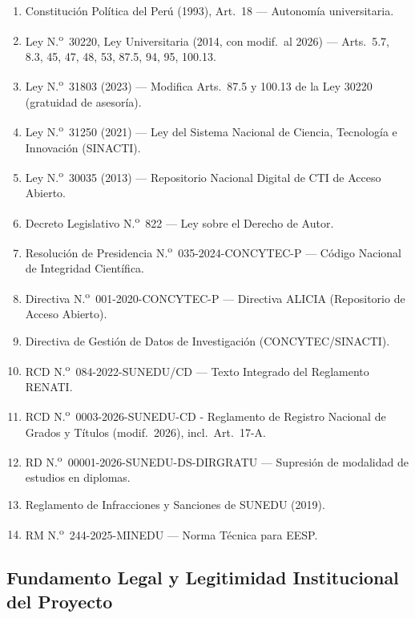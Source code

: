 \vspace{10pt}
\begingroup
\normalsize
\begin{enumerate}[leftmargin=*, nosep, label={\arabic*.}]
  \item Constitución Política del Perú (1993), Art.~18 --- Autonomía universitaria.
  \item Ley N.\textsuperscript{o}~30220, Ley Universitaria (2014, con modif.\ al 2026) --- Arts.~5.7, 8.3, 45, 47, 48, 53, 87.5, 94, 95, 100.13.
  \item Ley N.\textsuperscript{o}~31803 (2023) --- Modifica Arts.~87.5 y 100.13 de la Ley 30220 (gratuidad de asesoría).
  \item Ley N.\textsuperscript{o}~31250 (2021) --- Ley del Sistema Nacional de Ciencia, Tecnología e Innovación (SINACTI).
  \item Ley N.\textsuperscript{o}~30035 (2013) --- Repositorio Nacional Digital de CTI de Acceso Abierto.
  \item Decreto Legislativo N.\textsuperscript{o}~822 --- Ley sobre el Derecho de Autor.
  \item Resolución de Presidencia N.\textsuperscript{o}~035-2024-CONCYTEC-P --- Código Nacional de Integridad Científica.
  \item Directiva N.\textsuperscript{o}~001-2020-CONCYTEC-P --- Directiva ALICIA (Repositorio de Acceso Abierto).
  \item Directiva de Gestión de Datos de Investigación (CONCYTEC/SINACTI).
  \item RCD N.\textsuperscript{o}~084-2022-SUNEDU/CD --- Texto Integrado del Reglamento RENATI.
  \item RCD N.\textsuperscript{o}~0003-2026-SUNEDU-CD - Reglamento de Registro Nacional de Grados y Títulos (modif.\ 2026), incl.\ Art.~17-A.
  \item RD N.\textsuperscript{o}~00001-2026-SUNEDU-DS-DIRGRATU --- Supresión de modalidad de estudios en diplomas.
  \item Reglamento de Infracciones y Sanciones de SUNEDU (2019).
  \item RM N.\textsuperscript{o}~244-2025-MINEDU --- Norma Técnica para EESP.
\end{enumerate}
\endgroup

\clearpage
\subsection{Fundamento Legal y Legitimidad Institucional del Proyecto}

